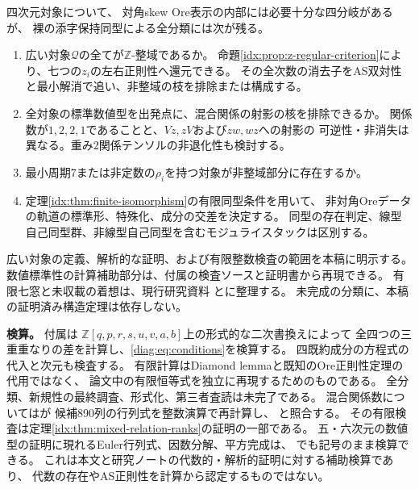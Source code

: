 \documentclass[11pt,a4paper]{ltjsarticle}
\theoremstyle{definition}
\newcommand{\ZZ}{\mathbb Z}
\begin{document}
四次元対象について、
対角skew Ore表示の内部には必要十分な四分岐があるが、
裸の添字保持同型による全分類には次が残る。
\begin{enumerate}
\item 広い対象$\mathcal Q$の全てが$\mathbb Z$-整域であるか。
命題\ref{idx:prop:z-regular-criterion}により、七つの$z_i$の左右正則性へ還元できる。
その全次数の消去子をAS双対性と最小解消で追い、非整域の枝を排除または構成する。
\item 全対象の標準数値型を出発点に、混合関係の射影の核を排除できるか。
関係数が$1,2,2,1$であることと、$Vz,zV$および$zw,wz$への射影の
可逆性・非消失は異なる。重み2関係テンソルの非退化性も検討する。
\item 最小周期7または非定数の$\rho_i$を持つ対象が非整域部分に存在するか。
\item 定理\ref{idx:thm:finite-isomorphism}の有限同型条件を用いて、
非対角Oreデータの軌道の標準形、特殊化、成分の交差を決定する。
同型の存在判定、線型自己同型群、非線型自己同型を含むモジュライスタックは区別する。
\end{enumerate}
広い対象の定義、解析的な証明、および有限整数検査の範囲を本稿に明示する。
数値標準性の計算補助部分は、付属の検査ソースと証明書から再現できる。
有限七窓と未収載の着想は、現行研究資料
とに整理する。
未完成の分類に、本稿の証明済み構造定理は依存しない。

\par\smallskip\noindent\textbf{検算。}\quad
付属は
$\ZZ[q,p,r,s,u,v,a,b]$上の形式的な二次書換えによって
全四つの三重重なりの差を計算し、\eqref{diag:eq:conditions}を検算する。
四既約成分の方程式の代入と次元も検査する。
有限計算はDiamond lemmaと既知のOre正則性定理の代用ではなく、
論文中の有限恒等式を独立に再現するためのものである。
全分類、新規性の最終調査、形式化、第三者査読は未完了である。
混合関係数についてはが
候補890列の行列式を整数演算で再計算し、
と照合する。
その有限検査は定理\ref{idx:thm:mixed-relation-ranks}の証明の一部である。
五・六次元の数値型の証明に現れるEuler行列式、因数分解、平方完成は、
でも記号のまま検算できる。
これは本文と研究ノートの代数的・解析的証明に対する補助検算であり、
代数の存在やAS正則性を計算から認定するものではない。
\end{document}
